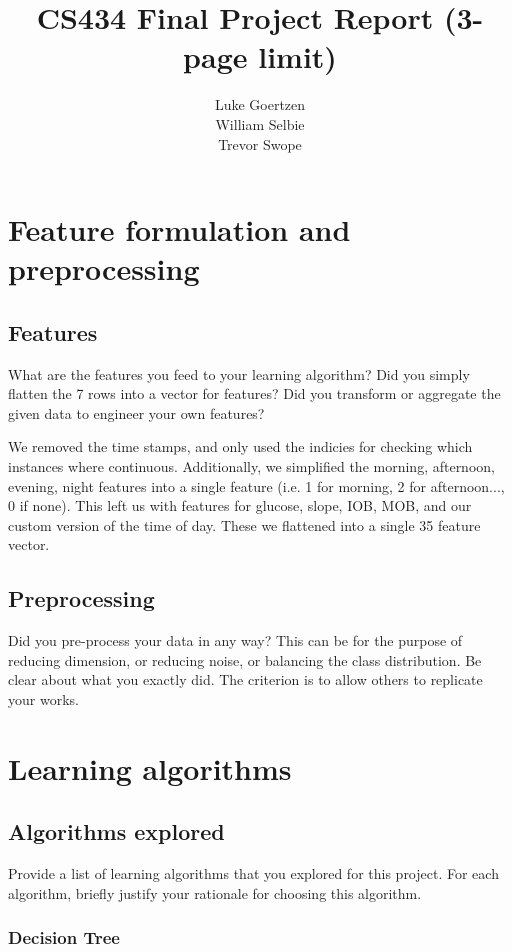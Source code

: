 \documentclass[11pt,a4paper]{article}
\title{CS434 Final Project Report (3-page limit)}
\author{Luke Goertzen \\ William Selbie \\ Trevor Swope}
\date{}
\begin{document}
\maketitle

\section{Feature formulation and preprocessing}

\subsection{Features} 
What are the features you feed to your learning algorithm? Did you simply flatten the 7 rows into a vector for features? Did you transform or aggregate the given data to engineer your own features?

We removed the time stamps, and only used the indicies for checking which instances where continuous. Additionally, we simplified the morning, afternoon, evening, night features into a single feature (i.e. 1 for morning, 2 for afternoon..., 0 if none). This left us with features for  glucose, slope, IOB, MOB, and our custom version of the time of day. These we flattened into a single 35 feature vector.


\subsection{Preprocessing}

Did you pre-process your data in any way? This can be for the purpose of reducing dimension, or reducing noise, or balancing the class distribution. Be clear about what you exactly did. The criterion is to allow others to replicate your works.



\section{Learning algorithms}

\subsection{Algorithms explored}
Provide a list of learning algorithms that you explored for this project. For each algorithm, briefly justify your rationale for choosing this algorithm.

\subsubsection{Decision Tree}
\end{document}
